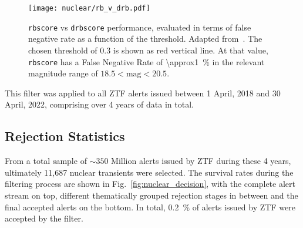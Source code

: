 \begin{figure}[htpb]
  \texttt{[image: nuclear/rb\_v\_drb.pdf]}
  \caption[\texttt{rbscore}/\texttt{drbscore} performance]{\texttt{rbscore} vs \texttt{drbscore} performance, evaluated in terms of false negative rate as a function of the threshold. Adapted from~\cite{Duev2019}. The chosen threshold of 0.3 is shown as red vertical line. At that value, \texttt{rbscore} has a False Negative Rate of \SI{\approx1}{\percent} in the relevant magnitude range of $18.5 < \text{mag} < 20.5$.}
\end{figure}

This filter was applied to all ZTF alerts issued between 1 April, 2018 and 30 April, 2022, comprising over 4 years of data in total.

\subsection{Rejection Statistics}
From a total sample of $\sim 350$ Million alerts issued by ZTF during these 4 years, ultimately 11,687 nuclear transients were selected. The survival rates during the filtering process are shown in Fig.~\ref{fig:nuclear_decision}, with the complete alert stream on top, different thematically grouped rejection stages in between and the final accepted alerts on the bottom. In total, \SI{0.2}{\percent} of alerts issued by ZTF were accepted by the filter.

